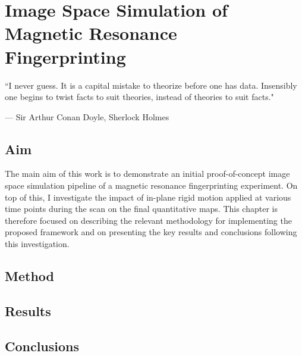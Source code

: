 \chapter{Image Space Simulation of Magnetic Resonance Fingerprinting}
\label{chapterlabel3}
\epigraph{``I never guess. It is a capital mistake to theorize before one has data. Insensibly one begins to twist facts to suit theories, instead of theories to suit facts."}{--- \textup{Sir Arthur Conan Doyle}, Sherlock Holmes}

\section{Aim}\label{chapterlabel3sec1}
The main aim of this work is to demonstrate an initial proof-of-concept image space simulation pipeline of a magnetic resonance fingerprinting experiment.
On top of this, I investigate the impact of in-plane rigid motion applied at various time points during the scan on the final quantitative maps.
This chapter is therefore focused on describing the relevant methodology for implementing the proposed framework and on presenting the key results and conclusions following this investigation.

\section{Method}\label{chapterlabel3sec2}


\section{Results}\label{chapterlabel3sec3}


\section{Conclusions}\label{chapterlabel3sec4}

